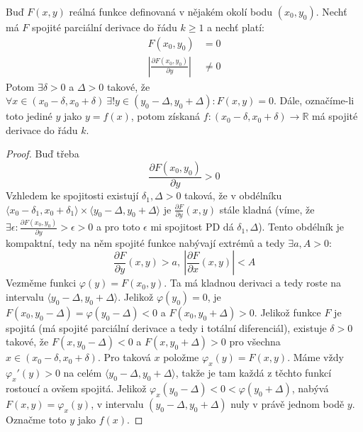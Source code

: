 \documentclass[../main.tex]{subfiles}
\begin{document}
\begin{theorem}
	Buď $F(x,y)$ reálná funkce definovaná v nějakém okolí bodu $(x_0, y_0)$. Nechť má $F$ spojité parciální
	derivace do řádu $k \geq 1$ a nechť platí:
	\begin{align*}
	    F(x_0, y_0) &= 0\\
	    \left| \frac{\partial F(x_0,y_0)}{\partial y} \right| &\neq 0
	\end{align*}
	Potom $ \exists \delta > 0$ a $\Delta > 0$ takové, že
	$\forall x \in (x_0 - \delta , x_0 + \delta)\ \exists! y \in (y_0 - \Delta , y_0 + \Delta): F(x,y) = 0$.
	Dále, označíme-li toto jediné $y$ jako $y = f(x)$, potom získaná
	$f: (x_0 - \delta , x_0 + \delta ) \to \mathbb{R}$ má spojité derivace do řádu $k$.
\end{theorem}

\begin{proof}
	Buď třeba
	$$
	\frac{\partial F(x_0, y_0)}{\partial y} > 0
	$$
	Vzhledem ke spojitosti existují $\delta_1, \Delta > 0$ taková, že v
	obdélníku $\langle x_0 - \delta_1, x_0 + \delta_1 \rangle \times
	\langle y_0 - \Delta, y_0 + \Delta \rangle$ je $\frac{\partial
	F}{\partial y} (x, y)$ stále kladná (víme, že $\exists \epsilon:
	\frac{\partial F(x_0, y_0)}{\partial y} > \epsilon > 0$ a pro toto
	$\epsilon$ mi spojitost PD dá $\delta_1, \Delta$). Tento obdélník je
	kompaktní, tedy na něm spojité funkce nabývají extrémů a tedy $\exists
	a, A > 0:$
	\begin{equation} \label{eq:1}
		\frac{\partial F}{\partial y}(x, y) > a,~ \left |
		\frac{\partial F}{\partial x}(x, y) \right | < A
	\end{equation}
	Vezměme funkci $\varphi(y) = F(x_0, y)$. Ta má kladnou derivaci a tedy
	roste na intervalu $\langle y_0 - \Delta, y_0 + \Delta \rangle$.
	Jelikož $\varphi(y_0) = 0$, je $F(x_0, y_0 - \Delta) = \varphi(y_0 -
	\Delta) < 0$ a $F(x_0, y_0 + \Delta) > 0$. Jelikož funkce $F$ je
	spojitá (má spojité parciální derivace a tedy i totální diferenciál),
	existuje $\delta > 0$ takové, že $F(x, y_0 - \Delta) < 0$ a $F(x, y_0 +
	\Delta) > 0$ pro všechna $x \in (x_0 - \delta, x_0 + \delta)$. Pro
	taková $x$ položme $\varphi_x(y) = F(x, y)$. Máme vždy $\varphi_x'(y) >
	0$ na celém $\langle y_0 - \Delta, y_0 + \Delta \rangle$, takže je tam
	každá z těchto funkcí rostoucí a ovšem spojitá. Jelikož $\varphi_x(y_0
	- \Delta) < 0 < \varphi(y_0 + \Delta)$, nabývá $F(x, y) =
	\varphi_x(y)$, v intervalu $(y_0 - \Delta, y_0 + \Delta)$ nuly v právě
	jednom bodě $y$. Označme toto $y$ jako $f(x)$.


\end{proof}
\end{document}

